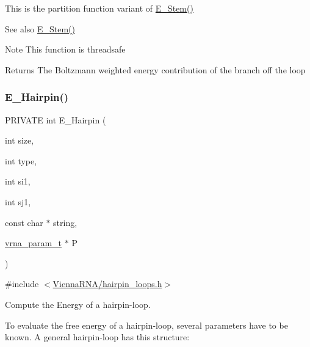 This is the partition function variant of \hyperlink{group__loops_ga51f9851f3500c2aae66674142a6a2dd5}{E\+\_\+\+Stem()} \begin{DoxySeeAlso}{See also}
\hyperlink{group__loops_ga51f9851f3500c2aae66674142a6a2dd5}{E\+\_\+\+Stem()} 
\end{DoxySeeAlso}
\begin{DoxyNote}{Note}
This function is threadsafe
\end{DoxyNote}
\begin{DoxyReturn}{Returns}
The Boltzmann weighted energy contribution of the branch off the loop 
\end{DoxyReturn}
\mbox{\label{group__loops_gadf943ee9a45b7f4cee9192c06210dace}} 
\subsubsection{\texorpdfstring{E\+\_\+\+Hairpin()}{E\_Hairpin()}}
{\footnotesize\ttfamily P\+R\+I\+V\+A\+TE int E\+\_\+\+Hairpin (\begin{DoxyParamCaption}\item[{int}]{size,  }\item[{int}]{type,  }\item[{int}]{si1,  }\item[{int}]{sj1,  }\item[{const char $\ast$}]{string,  }\item[{\hyperlink{group__energy__parameters_ga8a69ca7d787e4fd6079914f5343a1f35}{vrna\+\_\+param\+\_\+t} $\ast$}]{P }\end{DoxyParamCaption})}



{\ttfamily \#include $<$\hyperlink{hairpin__loops_8h}{Vienna\+R\+N\+A/hairpin\+\_\+loops.\+h}$>$}



Compute the Energy of a hairpin-\/loop. 

To evaluate the free energy of a hairpin-\/loop, several parameters have to be known. A general hairpin-\/loop has this structure\+:~\newline
 
